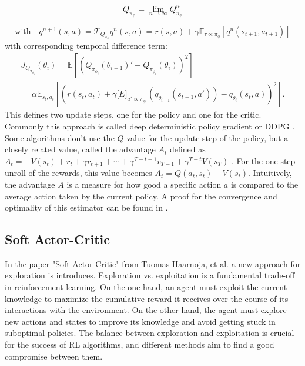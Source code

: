 \begin{equation}
    Q_{\pi_{\phi}} = \lim_{n \to \infty} Q^n_{\pi_{\phi}}
\end{equation}

\begin{equation*}
    \text{with}\quad q^{n+1}(s,a) = \mathcal{T}_{Q_{\pi_{\phi}}}q^n(s,a) = r(s,a) + \gamma \mathbb{E}_{\tau \propto {\pi_{\phi}}}[q^n(s_{t+1}, a_{t+1})]
\end{equation*}
with corresponding temporal difference term:
\begin{equation}
    \begin{aligned}
        J_{Q_{\pi_{\phi_i}}}(\theta_{i}) = \mathbb{E}\left[\left({Q_{\pi_{\phi_i}}}(\theta_{i-1})' - Q_{\pi_{\phi_i}}(\theta_{i}) \right)^2\right]\\
        = \alpha \mathbb{E}_{s_t, a_t}\left[\left( r(s_t, a_t) + \gamma \mathbb[E]_{a' \propto \pi_{\phi_i}}\left( q_{\theta_{i-1}}(s_{t+1}, a')\right) - q_{\theta_{i}}(s_t, a)\right)^2\right].
    \end{aligned}
\end{equation}
This defines two update steps, one for the policy and one for the critic. Commonly this approach is called deep deterministic policy gradient or DDPG \cite{https://arxiv.org/pdf/1509.02971.pdf}. Some algorithms don't use the $Q$ value for the update step of the policy, but a closely 
related value, called the advantage $A_t$ defined as $A_t = -V(s_t) + r_t + \gamma r_{t+1} + \cdots + \gamma^{T-t+1} r_{T-1} + \gamma^{T-t} V(s_T)$ \cite{A2C}. For the one step 
unroll of the rewards, this value becomes $A_t = Q(a_t, s_t) - V(s_t)$. 
Intuitively, the advantage $A$ is a measure for how good a specific action $a$ is compared to the average action taken by the current policy. 
A proof for the convergence and optimality of this estimator can be found in \cite{proof_A}.

\subsection{Soft Actor-Critic}
\label{SAC}
In the paper "Soft Actor-Critic" from Tuomas Haarnoja, et al. \cite{haarnoja2018soft} a new approach for exploration is introduces. Exploration vs. exploitation 
is a fundamental trade-off in reinforcement learning. On the one hand, an agent must exploit the current knowledge to maximize the cumulative reward it receives 
over the course of its interactions with the environment. On the other hand, the agent must explore new actions and states to improve its knowledge and avoid getting stuck in suboptimal policies. 
The balance between exploration and exploitation is crucial for the success of RL algorithms, and different methods aim to find a good compromise between them.

